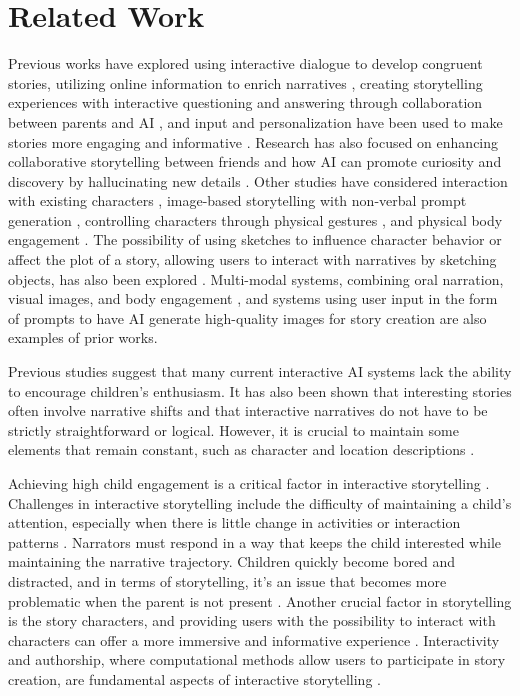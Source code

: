 \documentclass[submit,techrep,english]{ipsj}
\begin{document}
\section{Related Work}
\label{sec:related-work}

Previous works have explored using interactive dialogue to develop congruent stories, utilizing online information to enrich narratives \cite{13:abs-2011-04242}, creating storytelling experiences with interactive questioning and answering through collaboration between parents and AI \cite{12:ZhangXWYRWYWL22}, and input and personalization have been used to make stories more engaging and informative \cite{14:WangRCRMB22}. Research has also focused on enhancing collaborative storytelling between friends and how AI can promote curiosity and discovery by hallucinating new details \cite{8:ShakeriND21}. Other studies have considered interaction with existing characters \cite{10:ChopraVSS21}, image-based storytelling with non-verbal prompt generation \cite{4:HanC23}, controlling characters through physical gestures \cite{2:LiuLWCS12}, and physical body engagement \cite{3:ZhaoB23}. The possibility of using sketches to influence character behavior or affect the plot of a story, allowing users to interact with narratives by sketching objects, has also been explored \cite{11:LimaGV20}. Multi-modal systems, combining oral narration, visual images, and body engagement \cite{3:ZhaoB23}, and systems using user input in the form of prompts to have AI generate high-quality images for story creation \cite{4:HanC23} are also examples of prior works.

Previous studies suggest that many current interactive AI systems lack the ability to encourage children's enthusiasm. It has also been shown that interesting stories often involve narrative shifts and that interactive narratives do not have to be strictly straightforward or logical. However, it is crucial to maintain some elements that remain constant, such as character and location descriptions \cite{13:abs-2011-04242}.

Achieving high child engagement is a critical factor in interactive storytelling \cite{12:ZhangXWYRWYWL22}. Challenges in interactive storytelling include the difficulty of maintaining a child's attention, especially when there is little change in activities or interaction patterns \cite{13:abs-2011-04242}. Narrators must respond in a way that keeps the child interested while maintaining the narrative trajectory. Children quickly become bored and distracted, and in terms of storytelling, it's an issue that becomes more problematic when the parent is not present \cite{12:ZhangXWYRWYWL22}. Another crucial factor in storytelling is the story characters, and providing users with the possibility to interact with characters can offer a more immersive and informative experience \cite{10:ChopraVSS21}. Interactivity and authorship, where computational methods allow users to participate in story creation, are fundamental aspects of interactive storytelling \cite{11:LimaGV20}.
\end{document}
